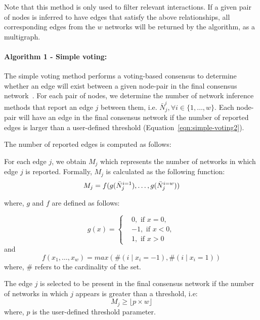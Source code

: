     Note that this method is only used to filter relevant interactions.
    If a given pair of nodes is inferred to have edges that satisfy the above relationships, all corresponding edges from the $w$ networks will be returned by the algorithm, as a multigraph.

  \paragraph*{Algorithm 1 - Simple voting:}
  The simple voting method performs a voting-based consensus to determine whether an edge will exist between a given node-pair in the final consensus network~\cite{bustinceFuzzySetsTheir2008,tsarevApplicationMajorityVoting2018}.
  For each pair of nodes, we determine the number of network inference methods that report an edge $j$ between them, i.e. $\bar{N}^{i}_{j}, \forall i \in \{1,\dots,w\}$.
  Each node-pair will have an edge in the final consensus network if the number of reported edges is larger than a user-defined threshold (Equation~\ref{eqn:simple-voting2}).

 The number of reported edges is computed as follows:

 For each edge $j$, we obtain $M_j$ which represents the number of networks in which edge $j$ is reported.
 Formally, $M_j$ is calculated as the following function:
  \begin{equation}
      M_j = f(g(\bar{N}^{i=1}_j), \dots, g(\bar{N}^{i=w}_j)) \\
    \label{eq:simple-voting}
  \end{equation}

where, $g$ and $f$ are defined as follows:

  \begin{equation*}
    g(x) =
    \begin{cases}
       & 0, \text{ if } x=0, \\
       & -1, \text{ if } x<0, \\
       & 1, \text{ if } x>0
    \end{cases}
  \end{equation*}
  and
  \begin{equation*}
    f(x_1,\dots,x_w) = max \left( \#(i \mid x_i=-1),\#(i \mid x_i=1)
       \right)
  \end{equation*}
  where, $\#$ refers to the cardinality of the set.

 The edge $j$ is selected to be present in the final consensus network if the number of networks in which $j$ appears is greater than a threshold, i.e:
  \begin{equation}
     M_j \geq \lfloor p \times w \rfloor
    \label{eqn:simple-voting2}
  \end{equation}
  where, $p$ is the user-defined threshold parameter.

